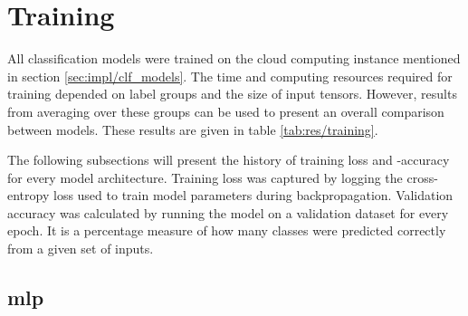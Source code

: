 \section{Training} \label{sec:res/training}

All classification models were trained on the cloud computing instance mentioned in section \ref{sec:impl/clf_models}. The time and computing resources required for training depended on label groups and the size of input tensors. However, results from averaging over these groups can be used to present an overall comparison between models. These results are given in table \ref{tab:res/training}.

\begin{table}[h!]
    \caption{Average time and epochs elapsed during training for all model architectures.}
    \label{tab:res/training}
\end{table}
\FloatBarrier

The following subsections will present the history of training loss and -accuracy for every model architecture. Training loss was captured by logging the cross-entropy loss used to train model parameters during backpropagation. Validation accuracy was calculated by running the model on a validation dataset for every epoch. It is a percentage measure of how many classes were predicted correctly from a given set of inputs.

\subsection{\acrlong{mlp}}

